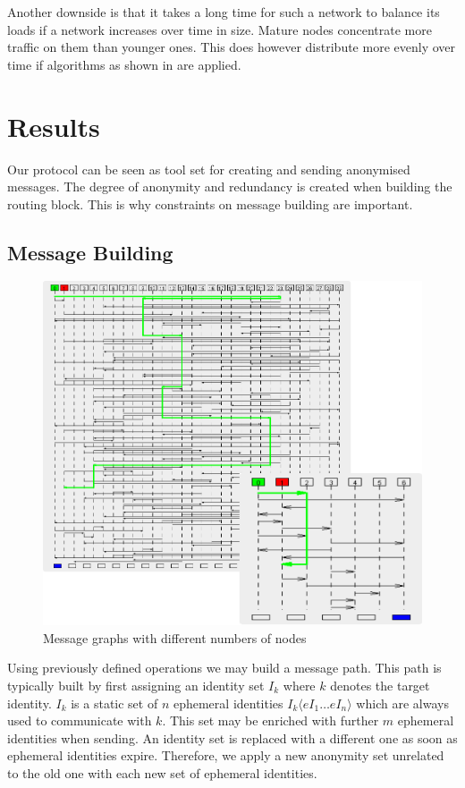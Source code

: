 \documentclass[9pt,journal,compsoc]{IEEEtran}
\begin{document}
Another downside is that it takes a long time for such a network to balance its loads if a network increases over time in size. Mature nodes concentrate more traffic on them than younger ones. This does however distribute more evenly over time if algorithms as shown in \cite{messageVortex} are applied.

\section{Results}
Our protocol can be seen as tool set for creating and sending anonymised messages. The degree of anonymity and redundancy is created when building the routing block. This is why constraints on message building are important.

\subsection{Message Building}
\begin{figure}[htb]
	\centering
	\includegraphics[width=0.8\columnwidth]{msgGraph3}
	\caption{Message graphs with different numbers of nodes}
	\label{fig:mgsGraph}
\end{figure}

Using previously defined operations we may build a message path. This path is typically built by first assigning an identity set $I_k$ where  $k$ denotes the target identity. $I_k$ is a static set of $n$ ephemeral identities $I_k\langle eI_1 \ldots eI_n\rangle$ which are always used to communicate with $k$. This set may be enriched with further $m$ ephemeral identities when sending. An identity set is replaced with a different one as soon as ephemeral identities expire. Therefore, we apply a new anonymity set unrelated to the old one with each new set of ephemeral identities.
\end{document}
